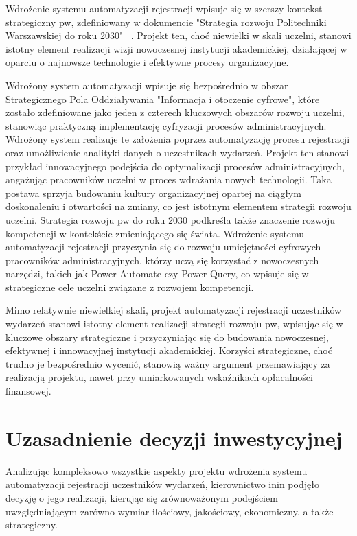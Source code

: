 Wdrożenie systemu automatyzacji rejestracji wpisuje się w szerszy kontekst strategiczny \gls{pw}, zdefiniowany w dokumencie "Strategia rozwoju Politechniki Warszawskiej do roku 2030" ~\parencite[s. 16]{PW2030}. Projekt ten, choć niewielki w skali uczelni, stanowi istotny element realizacji wizji nowoczesnej instytucji akademickiej, działającej w oparciu o najnowsze technologie i efektywne procesy organizacyjne.

Wdrożony system automatyzacji wpisuje się bezpośrednio w obszar Strategicznego Pola Oddziaływania "Informacja i otoczenie cyfrowe", które zostało zdefiniowane jako jeden z czterech kluczowych obszarów rozwoju uczelni, stanowiąc praktyczną implementację cyfryzacji procesów administracyjnych. Wdrożony system realizuje te założenia poprzez automatyzację procesu rejestracji oraz umożliwienie analityki danych o uczestnikach wydarzeń. Projekt ten stanowi przykład innowacyjnego podejścia do optymalizacji procesów administracyjnych, angażując pracowników uczelni w proces wdrażania nowych technologii. Taka postawa sprzyja budowaniu kultury organizacyjnej opartej na ciągłym doskonaleniu i otwartości na zmiany, co jest istotnym elementem strategii rozwoju uczelni. Strategia rozwoju \gls{pw} do roku 2030 podkreśla także znaczenie rozwoju kompetencji w kontekście zmieniającego się świata. Wdrożenie systemu automatyzacji rejestracji przyczynia się do rozwoju umiejętności cyfrowych pracowników administracyjnych, którzy uczą się korzystać z nowoczesnych narzędzi, takich jak Power Automate czy Power Query, co wpisuje się w strategiczne cele uczelni związane z rozwojem kompetencji.

Mimo relatywnie niewielkiej skali, projekt automatyzacji rejestracji uczestników wydarzeń stanowi istotny element realizacji strategii rozwoju \gls{pw}, wpisując się w kluczowe obszary strategiczne i przyczyniając się do budowania nowoczesnej, efektywnej i innowacyjnej instytucji akademickiej. Korzyści strategiczne, choć trudno je bezpośrednio wycenić, stanowią ważny argument przemawiający za realizacją projektu, nawet przy umiarkowanych wskaźnikach opłacalności finansowej.

\section{Uzasadnienie decyzji inwestycyjnej}
Analizując kompleksowo wszystkie aspekty projektu wdrożenia systemu automatyzacji rejestracji uczestników wydarzeń, kierownictwo \gls{inin} podjęło decyzję o jego realizacji, kierując się zrównoważonym podejściem uwzględniającym zarówno wymiar ilościowy, jakościowy, ekonomiczny, a także strategiczny.

